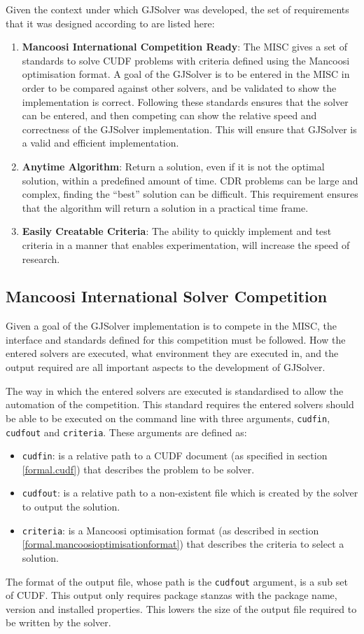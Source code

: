 Given the context under which GJSolver was developed, the set of requirements that it was designed according to are listed here:
\begin{enumerate}
  \item \textbf{Mancoosi International Competition Ready}: The MISC gives a set of standards to solve CUDF problems with criteria defined using the Mancoosi optimisation format.
  A goal of the GJSolver is to be entered in the MISC in order to be compared against other solvers, and be validated to show the implementation is correct.
  Following these standards ensures that the solver can be entered, and then competing can show the relative speed and correctness of the GJSolver implementation.
  This will ensure that GJSolver is a valid and efficient implementation. 
  \item \textbf{Anytime Algorithm}: Return a solution, even if it is not the optimal solution, within a predefined amount of time. 
  CDR problems can be large and complex, finding the ``best'' solution can be difficult. 
  This requirement ensures that the algorithm will return a solution in a practical time frame.
  \item \textbf{Easily Creatable Criteria}: The ability to quickly implement and test criteria in a manner that enables experimentation, will increase the speed of research.
\end{enumerate}

\subsection{Mancoosi International Solver Competition}
Given a goal of the GJSolver implementation is to compete in the MISC, the interface and standards defined for this competition must be followed.
How the entered solvers are executed, what environment they are executed in, and the output required are all important aspects to the development of GJSolver.

The way in which the entered solvers are executed is standardised to allow the automation of the competition.
This standard requires the entered solvers should be able to be executed on the command line with three arguments, \verb+cudfin+, \verb+cudfout+ and \verb+criteria+.
These arguments are defined as:
\begin{itemize}
  \item \verb+cudfin+: is a relative path to a CUDF document (as specified in section \ref{formal.cudf}) that describes the problem to be solver.
  \item \verb+cudfout+: is a relative path to a non-existent file which is created by the solver to output the solution.
  \item \verb+criteria+: is a Mancoosi optimisation format (as described in section \ref{formal.mancoosioptimisationformat}) that describes the criteria to select a solution. 
\end{itemize}
The format of the output file, whose path is the \verb+cudfout+ argument, is a sub set of CUDF.
This output only requires package stanzas with the package name, version and installed properties.
This lowers the size of the output file required to be written by the solver.

